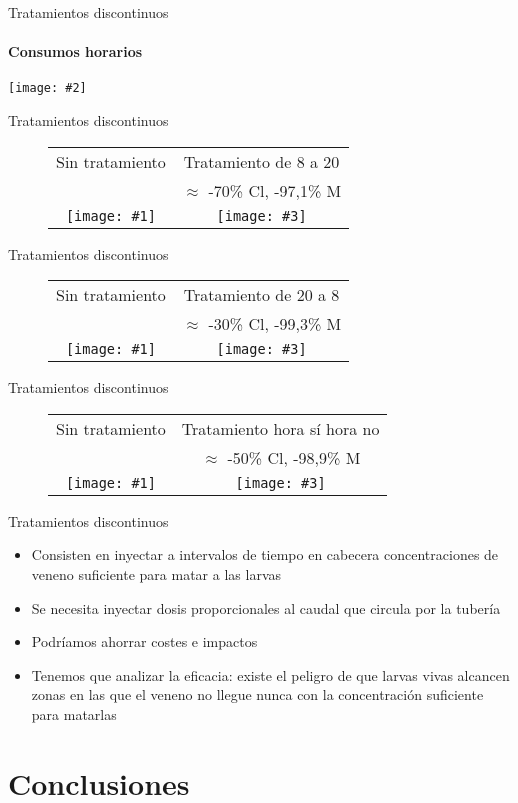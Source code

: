 \documentclass[pdr]{beamer}
\newcommand{\FIGURE}[2]
{
	\begin{center}
		\texttt{[image: \#2]}
	\end{center}
}
\newcommand{\FIGIIC}[5]
{
	\begin{figure}[ht!]
		\centering
		\begin{tabular}{cc}
			#2&#4\\
			&#5\\
			\texttt{[image: \#1]}&
			\texttt{[image: \#3]}
		\end{tabular}
	\end{figure}
}
\begin{document}
\begin{frame}{Tratamientos discontinuos}
	\framesubtitle{Consumos horarios}
	\FIGURE{\textwidth}{Consumos.pdf}
\end{frame}

\begin{frame}{Tratamientos discontinuos}
	\FIGIIC{2022-mussel-constant.pdf}{Sin tratamiento}
	{24-2021-chlorine-day.pdf}
	{Tratamiento de 8 a 20}{$\approx$ -70\% Cl, -97,1\% M}
\end{frame}

\begin{frame}{Tratamientos discontinuos}
	\FIGIIC{2022-mussel-constant.pdf}{Sin tratamiento}
	{24-2021-chlorine-dayb.pdf}
	{Tratamiento de 20 a 8}{$\approx$ -30\% Cl, -99,3\% M}
\end{frame}

\begin{frame}{Tratamientos discontinuos}
	\FIGIIC{2022-mussel-constant.pdf}{Sin tratamiento}
	{24-2021-chlorine-hour.pdf}
	{Tratamiento hora sí hora no}{$\approx$ -50\% Cl, -98,9\% M}
\end{frame}

\begin{frame}{Tratamientos discontinuos}
	\begin{itemize}
		\item Consisten en inyectar a intervalos de tiempo en cabecera
			concentraciones de veneno suficiente para matar a las
			larvas
		\item Se necesita inyectar dosis proporcionales al caudal que
			circula por la tubería
		\item Podríamos ahorrar costes e impactos
		\item Tenemos que analizar la eficacia: existe el peligro de que
			larvas vivas alcancen zonas en las que el veneno no
			llegue nunca con la concentración suficiente para
			matarlas
	\end{itemize}
\end{frame}

\section{Conclusiones}
\end{document}

